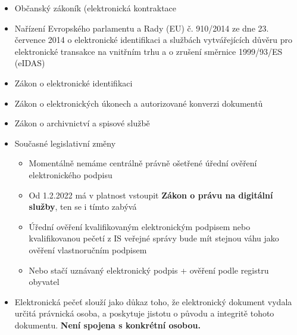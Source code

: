 \begin{itemize}
\begin{enumerate}
\begin{itemize}
                        \end{itemize}
            \end{enumerate}
      \item Občanský zákoník (elektronická kontraktace
      \item Nařízení Evropského parlamentu a Rady (EU) č. 910/2014 ze dne 23. července 2014 o elektronické identifikaci
            a službách vytvářejících důvěru pro elektronické transakce na vnitřním trhu a o zrušení směrnice 1999/93/ES
            (eIDAS)
      \item Zákon o elektronické identifikaci
      \item Zákon o elektronických úkonech a autorizované konverzi dokumentů
      \item Zákon o archivnictví a spisové službě
      \item Současné legislativní změny
      \begin{itemize}
          \item Momentálně nemáme centrálně právně ošetřené úřední ověření elektronického podpisu
          \item Od 1.2.2022 má v platnost vstoupit \textbf{Zákon o právu na digitální služby}, ten se i tímto zabývá
          \item Úřední ověření kvalifikovaným elektronickým podpisem nebo kvalifikovanou pečetí z IS veřejné správy bude mít stejnou váhu jako ověření vlastnoručním podpisem
          \item Nebo stačí uznávaný elektronický podpis + ověření podle registru obyvatel
      \end{itemize}
      \item  Elektronická pečeť slouží jako důkaz toho, že elektronický dokument vydala určitá právnická osoba, a poskytuje jistotu o původu a integritě tohoto dokumentu. \textbf{Není spojena s konkrétní osobou.}
\end{itemize}


